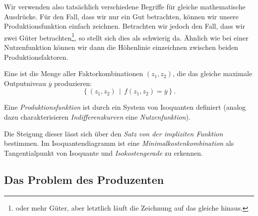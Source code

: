 Wir verwenden also tatsächlich verschiedene Begriffe für gleiche mathematische Ausdrücke. Für den Fall, dass wir nur ein Gut betrachten, können wir unsere Produktionsfunktion einfach zeichnen.
Betrachten wir jedoch den Fall, dass wir zwei Güter betrachten\footnote{oder mehr Güter, aber letztlich läuft die Zeichnung auf das gleiche hinaus.}, so stellt sich dies als schwierig da. Ähnlich wie bei einer Nutzenfunktion können wir dann die Höhenlinie einzeichnen zwischen beiden Produktionsfaktoren.

\begin{definition}
	Eine  ist die Menge aller Faktorkombinationen $(z_1, z_2)$, die das gleiche maximale Outputniveau $\overline{y}$ produzieren:
	\[
		\left\{ (z_1, z_2) \,\middle|\, f(z_1, z_2) = \overline{y} \right\}.
	\]
\end{definition}
Eine \textit{Produktionsfunktion} ist durch ein System von Isoquanten definiert (analog dazu charakterisieren \textit{Indifferenzkurven} eine \textit{Nutzenfunktion}).

Die Steigung dieser lässt sich über den \textit{Satz von der impliziten Funktion} bestimmen. Im Isoquantendiagramm ist eine \textit{Minimalkostenkombination} als Tangentialpunkt von Isoquante und \textit{Isokostengerade} zu erkennen.
\begin{center}
\end{center}



\subsection{Das Problem des Produzenten}

